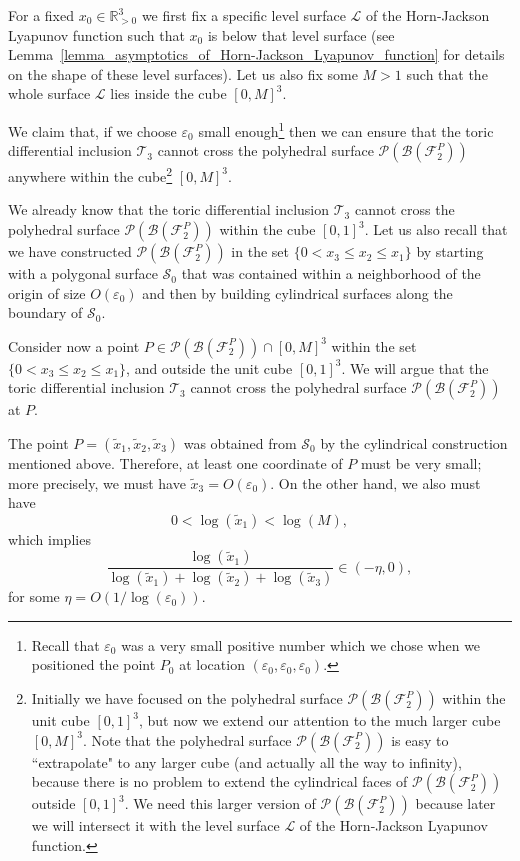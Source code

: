 \documentclass[12pt,letterpaper]{article}
\renewcommand{\S}{\mathcal{S}}
\newcommand{\T}{\mathcal{T}}
\renewcommand{\L}{\mathcal{L}}
\renewcommand{\P}{\mathcal{P}}
\newcommand{\B}{\mathcal{B}}
\newcommand{\RRp}{\mathbb{R}_{>0}}
\newcommand{\eps}{\varepsilon}
\begin{document}
\bigskip

For a fixed $x_0 \in \RRp^3$ we first fix a specific level surface $\L$ of the Horn-Jackson Lyapunov function such that $x_0$ is below that level surface (see Lemma~\ref{lemma_asymptotics_of_Horn-Jackson_Lyapunov_function} for details on the shape of these  level surfaces). Let us also fix some $M>1$ such that the whole surface $\L$ lies inside the cube $[0,M]^3$.

We claim that, if we choose $\eps_0$ small enough\footnote{Recall that $\eps_0$ was a very small positive number which we chose when we positioned the point $P_0$ at  location $(\eps_0,\eps_0,\eps_0)$.} then we can ensure that the toric differential inclusion $\T_3$ cannot cross the polyhedral surface $\P(\B(\mathcal{F}_2^P))$  anywhere within the cube\footnote{Initially we have focused on the polyhedral surface $\P(\B(\mathcal{F}_2^P))$ within the unit cube $[0,1]^3$, but now we extend our attention to the much larger cube $[0,M]^3$. Note that the polyhedral surface $\P(\B(\mathcal{F}_2^P))$ is easy to ``extrapolate" to any larger cube (and actually all the way to infinity), because there is no problem to extend the cylindrical faces of $\P(\B(\mathcal{F}_2^P))$ outside $[0,1]^3$. We need this larger version of $\P(\B(\mathcal{F}_2^P))$ because later we will intersect it with the level surface $\L$ of the Horn-Jackson Lyapunov function.} $[0,M]^3$. 



We already know that   the toric differential inclusion $\T_3$ cannot cross the polyhedral surface $\P(\B(\mathcal{F}_2^P))$  within the cube $[0,1]^3$. Let us also recall that we have constructed $\P(\B(\mathcal{F}_2^P))$ in the set $\{ 0< x_3 \le x_2 \le x_1 \}$ by starting with a polygonal surface $\S_0$ that was contained within a neighborhood of the origin of size $O(\eps_0)$ and then by building cylindrical surfaces along the boundary of $\S_0$. 

Consider now a point $P \in \P(\B(\mathcal{F}_2^P)) \cap [0,M]^3$ within the set $\{ 0<  x_3 \le x_2 \le x_1 \}$, and outside the unit cube $[0,1]^3$. We  will argue that  the toric differential inclusion $\T_3$ cannot cross the polyhedral surface $\P(\B(\mathcal{F}_2^P))$   at $P$. 

The point $P = (\tilde x_1, \tilde x_2, \tilde x_3)$ was obtained from $\S_0$ by the cylindrical construction mentioned above. Therefore, at least one coordinate of $P$ must be very small; more precisely, we  must have $\tilde x_3 = O(\eps_0)$. 
On the other hand, we also must have 
$$
0 < \log(\tilde x_1) < \log(M),
$$ 
which implies 
$$
\frac{\log(\tilde x_1) }{\log(\tilde x_1)  + \log(\tilde x_2)  + \log(\tilde x_3)}  \in (-\eta, 0 ),
$$
for some $\eta = O(1/\log(\eps_0))$. 
\end{document}
